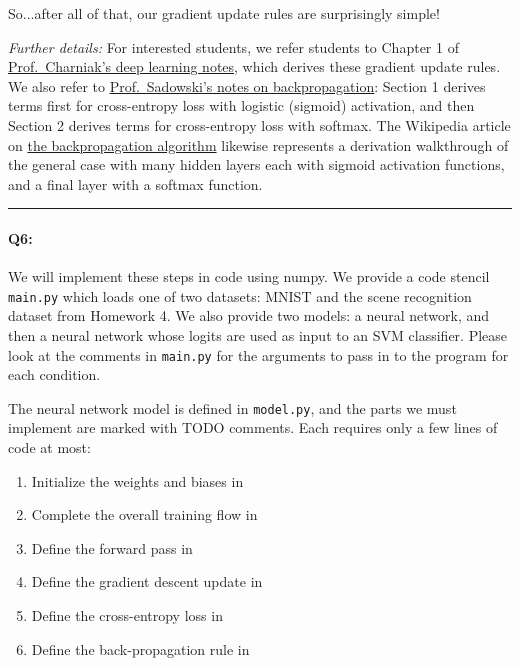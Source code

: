 So...after all of that, our gradient update rules are surprisingly simple!

\emph{Further details:} For interested students, we refer students to Chapter 1 of \href{https://cs.brown.edu/courses/csci1460/assets/files/deep-learning.pdf}{Prof.~Charniak's deep learning notes}, which derives these gradient update rules. We also refer to \href{https://www.ics.uci.edu/~pjsadows/notes.pdf}{Prof.~Sadowski's notes on backpropagation}: Section 1 derives terms first for cross-entropy loss with logistic (sigmoid) activation, and then Section 2 derives terms for cross-entropy loss with softmax. The Wikipedia article on \href{https://en.wikipedia.org/wiki/Backpropagation}{the backpropagation algorithm} likewise represents a derivation walkthrough of the general case with many hidden layers each with sigmoid activation functions, and a final layer with a softmax function.

\hspace{\fill}\rule{0.5\linewidth}{.5pt}\hspace{\fill}


\paragraph{Q6:} We will implement these steps in code using numpy. We provide a code stencil \texttt{main.py} which loads one of two datasets: MNIST and the scene recognition dataset from Homework 4. We also provide two models: a neural network, and then a neural network whose logits are used as input to an SVM classifier. Please look at the comments in \texttt{main.py} for the arguments to pass in to the program for each condition. 

The neural network model is defined in \texttt{model.py}, and the parts we must implement are marked with TODO comments. Each requires only a few lines of code at most:
\begin{enumerate}
    \item Initialize the weights and biases in 
    \item Complete the overall training flow in 
    \item Define the forward pass in 
    \item Define the gradient descent update in 
    \item Define the cross-entropy loss in 
    \item Define the back-propagation rule in 
\end{enumerate}

